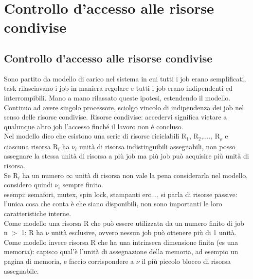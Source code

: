 \documentclass[12pt, oneside]{extbook}
\begin{document}
\chapter{Controllo d'accesso alle risorse condivise}
\section{Controllo d'accesso alle risorse condivise}
Sono partito da modello di carico nel sistema in cui tutti i job erano semplificati, task rilasciavano i job in maniera regolare e tutti i job erano indipendenti ed interrompibili. Mano a mano rilassato queste ipotesi, estendendo il modello. Continuo ad avere singolo processore, sciolgo vincolo di indipendenza dei job nel senso delle risorse condivise. Risorse condivise: accedervi significa vietare a qualunque altro job l'accesso finché il lavoro non è concluso.\\ Nel modello dico che esistono una serie di risorse riciclabili R$_{1}$, R$_{2}$,...., R$_{\rho}$ e ciascuna risorsa R$_{i}$ ha $\nu_{i}$ unità di risorsa indistinguibili assegnabili, non posso assegnare la stessa unità di risorsa a più job ma più job può acquisire più unità di risorsa.\\ Se R$_{i}$ ha un numero $\infty$ unità di risorsa non vale la pena considerarla nel modello,  considero quindi $\nu_{i}$ sempre finito.\\ esempi: semafori, mutex, spin lock, stampanti erc..., si parla di risorse passive: l'unica cosa che conta è che siano disponibili, non sono importanti le loro caratteristiche interne.\\ Come modello una risorsa R che può essere utilizzata da un numero finito di job n $>$ 1: R ha $\nu$ unità esclusive, ovvero nessun job può ottenere più di 1 unità. \\ Come modello invece risorsa R che ha una intrinseca dimensione finita (es una memoria): capisco qual'è l'unità di assegnazione della memoria, ad esempio un pagina di memoria, e faccio corrispondere a $\nu$ il più piccolo blocco di risorsa assegnabile.
\end{document}
